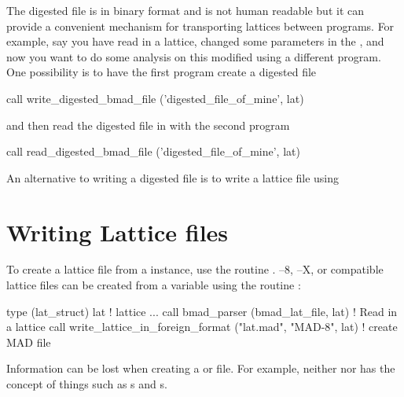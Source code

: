  The digested file is in binary
format and is not human readable but it can provide a convenient mechanism for transporting lattices
between programs. For example, say you have read in a lattice, changed some parameters in the
, and now you want to do some analysis on this modified  using a
different program.  One possibility is to have the first program create a digested file
\begin{example}
  call write_digested_bmad_file ('digested_file_of_mine', lat)
\end{example}
and then read the digested file in with the second program
\begin{example}
  call read_digested_bmad_file ('digested_file_of_mine', lat)
\end{example}
An alternative to writing a digested file is to write a lattice file
using 

\section{Writing Lattice files}
\label{s:lat.write}

 To create a \bmad lattice file from a
 instance, use the routine
.  \mad--8, \mad--X, or 
compatible lattice files can be created from a  variable using the routine
:
\begin{example}
  type (lat_struct) lat             ! lattice
  ...
  call bmad_parser (bmad_lat_file, lat)               ! Read in a lattice
  call write_lattice_in_foreign_format ("lat.mad", "MAD-8", lat)  ! create MAD file
\end{example}
Information can be lost when creating a \mad or  file.  For example, neither \mad nor
 has the concept of things such as s and s.

